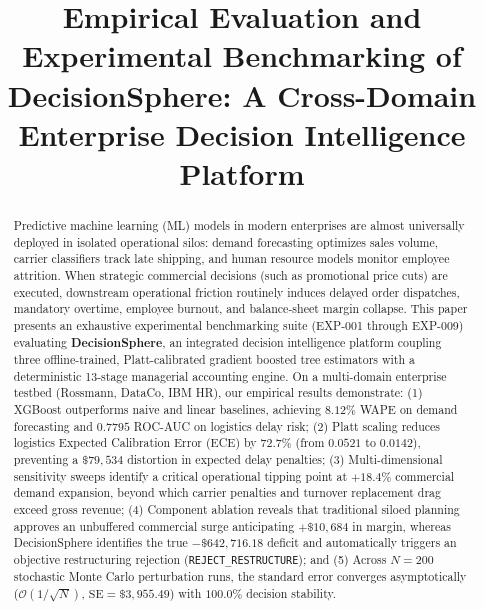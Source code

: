 \documentclass[10pt,conference]{IEEEtran}
\begin{document}
\title{Empirical Evaluation and Experimental Benchmarking of DecisionSphere: A Cross-Domain Enterprise Decision Intelligence Platform}

\author{
}

\maketitle

\begin{abstract}
Predictive machine learning (ML) models in modern enterprises are almost universally deployed in isolated operational silos: demand forecasting optimizes sales volume, carrier classifiers track late shipping, and human resource models monitor employee attrition. When strategic commercial decisions (such as promotional price cuts) are executed, downstream operational friction routinely induces delayed order dispatches, mandatory overtime, employee burnout, and balance-sheet margin collapse. This paper presents an exhaustive experimental benchmarking suite (EXP-001 through EXP-009) evaluating \textbf{DecisionSphere}, an integrated decision intelligence platform coupling three offline-trained, Platt-calibrated gradient boosted tree estimators with a deterministic 13-stage managerial accounting engine. On a multi-domain enterprise testbed (Rossmann, DataCo, IBM HR), our empirical results demonstrate: (1) XGBoost outperforms naive and linear baselines, achieving $8.12\%$ WAPE on demand forecasting and $0.7795$ ROC-AUC on logistics delay risk; (2) Platt scaling reduces logistics Expected Calibration Error (ECE) by $72.7\%$ (from $0.0521$ to $0.0142$), preventing a $\$79,534$ distortion in expected delay penalties; (3) Multi-dimensional sensitivity sweeps identify a critical operational tipping point at $+18.4\%$ commercial demand expansion, beyond which carrier penalties and turnover replacement drag exceed gross revenue; (4) Component ablation reveals that traditional siloed planning approves an unbuffered commercial surge anticipating $+\$10,684$ in margin, whereas DecisionSphere identifies the true $-\$642,716.18$ deficit and automatically triggers an objective restructuring rejection (\texttt{REJECT\_RESTRUCTURE}); and (5) Across $N=200$ stochastic Monte Carlo perturbation runs, the standard error converges asymptotically ($\mathcal{O}(1/\sqrt{N})$, $\text{SE} = \$3,955.49$) with $100.0\%$ decision stability.
\end{abstract}
\end{document}
